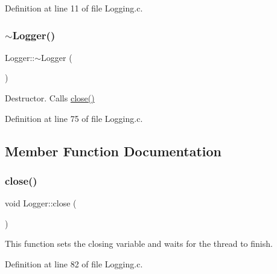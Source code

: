 Definition at line 11 of file Logging.\+c.

\mbox{\label{class_world_architect_1_1_logger_acb668a9e186a25fbaad2e4af6d1ed00a}} 
\subsubsection{\texorpdfstring{$\sim$Logger()}{~Logger()}}
{\footnotesize\ttfamily Logger\+::$\sim$\+Logger (\begin{DoxyParamCaption}{ }\end{DoxyParamCaption})}



Destructor. Calls \mbox{\hyperlink{class_world_architect_1_1_logger_afee2bab560c2db0190c980884d33868c}{close()}} 



Definition at line 75 of file Logging.\+c.



\subsection{Member Function Documentation}
\mbox{\label{class_world_architect_1_1_logger_afee2bab560c2db0190c980884d33868c}} 
\subsubsection{\texorpdfstring{close()}{close()}}
{\footnotesize\ttfamily void Logger\+::close (\begin{DoxyParamCaption}{ }\end{DoxyParamCaption})}



This function sets the closing variable and waits for the thread to finish. 



Definition at line 82 of file Logging.\+c.

\mbox{\label{class_world_architect_1_1_logger_a9baaacdb933276d67f4e1d7c213ceda0}} 
